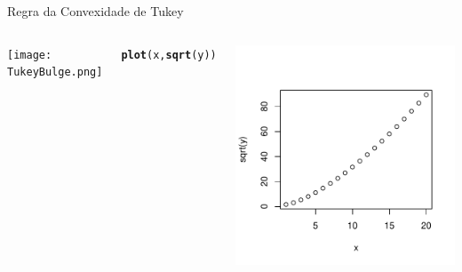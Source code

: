 \documentclass{beamer}\usepackage[]{graphicx}\usepackage[]{color}
\makeatletter
\newcommand{\hlstd}[1]{\textcolor[rgb]{0.345,0.345,0.345}{#1}}%
\newcommand{\hlkwd}[1]{\textcolor[rgb]{0.737,0.353,0.396}{\textbf{#1}}}%
\newenvironment{kframe}{%
 \def\at@end@of@kframe{}%
 \ifinner\ifhmode%
  \def\at@end@of@kframe{\end{minipage}}%
  \begin{minipage}{\columnwidth}%
 \fi\fi%
 \def\FrameCommand##1{\hskip\@totalleftmargin \hskip-\fboxsep
 \colorbox{shadecolor}{##1}\hskip-\fboxsep
     \hskip-\linewidth \hskip-\@totalleftmargin \hskip\columnwidth}%
 \MakeFramed {\advance\hsize-\width
   \@totalleftmargin\z@ \linewidth\hsize
   \@setminipage}}%
 {\par\unskip\endMakeFramed%
 \at@end@of@kframe}
\newenvironment{knitrout}{}{} %
\renewenvironment{knitrout}{\setlength{\topsep}{0mm}}{}
\makeatother
\begin{document}
\begin{frame}{Regra da Convexidade de Tukey}

\begin{columns}[c]

\centering
\texttt{[image: TukeyBulge.png]}

\centering
\begin{knitrout}\scriptsize
{}\color{fgcolor}\begin{kframe}
\begin{alltt}
\hlkwd{plot}\hlstd{(x,}\hlkwd{sqrt}\hlstd{(y))}
\end{alltt}
\end{kframe}
\includegraphics[width=0.7\linewidth]{figure/rem2-1} 

\end{knitrout}

\end{columns}

\end{frame}
\end{document}
